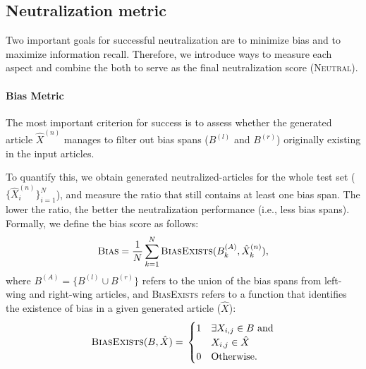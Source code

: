 \documentclass[11pt,a4paper]{article}
\newcommand{\rouge}{{\scshape Rouge-1}}
\newcommand{\all}{$\textsc{Bias}$}
\newcommand{\neutral}{\textsc{Neutral}}
\newcommand{\finetune}{$\texttt{BART}_{ft}$}
\newcommand{\tfive}{$\texttt{T5}_{ft}$}
\newcommand{\prop}{$\texttt{BART}_{ft+\mathcal{L}_\texttt{Prop}}$}
\newcommand{\fakenews}{$\texttt{BART}_{ft+\mathcal{L}_\texttt{FakeNews}}$}
\begin{document}


\subsection{Neutralization metric}
\label{section:metric}
Two important goals for successful neutralization are to minimize bias and to maximize information recall. Therefore, we introduce ways to measure each aspect and combine the both to serve as the final neutralization score (\neutral). 

\paragraph{Bias Metric} 
The most important criterion for success is to assess whether the generated article $\hat{X}^{(n)}$ manages to filter out bias spans ($B^{(l)}$ and $B^{(r)}$) originally existing in the input articles.

To quantify this, we obtain generated neutralized-articles for the whole test set ($\{\hat{X}_i^{(n)}\}_{i=1}^{N}$), and measure the ratio that still contains at least one bias span. The lower the ratio, the better the neutralization performance (i.e., less bias spans). 
Formally, we define the bias score as follows:
\begin{align}
    \textsc{Bias}  = \frac{1}{N}\sum_{k=1}^{N} \textsc{BiasExists}(B_k^{(A)},\hat{X}_k^{(n)}), 
\end{align}
where $B^{(A)}= \{B^{(l)} \cup B^{(r)}\}$ refers to the union of the bias spans from left-wing and right-wing articles, and \textsc{BiasExists} refers to a function that identifies the existence of bias in a given generated article ($\hat{X}$):
\begin{equation}
    \textsc{BiasExists}(B,\hat{X}) = \\
    \begin{cases}
      1 & \exists X_{i,j}\in B \ \mathrm{and} \\ & X_{i,j} \in \hat{X} \\
      0 & \text{Otherwise.}
    \end{cases}     
\end{equation}
\end{document}
